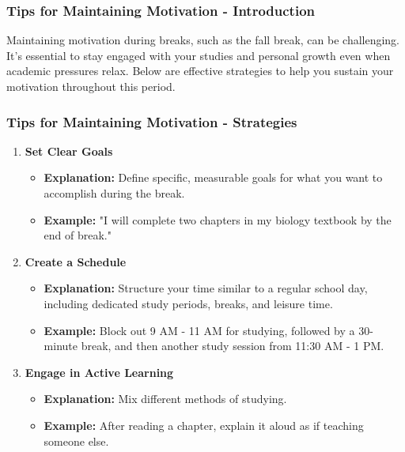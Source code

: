 \documentclass[aspectratio=169]{beamer}
\begin{document}
\begin{frame}[fragile]
    \frametitle{Tips for Maintaining Motivation - Introduction}
    Maintaining motivation during breaks, such as the fall break, can be challenging. 
    It's essential to stay engaged with your studies and personal growth even when academic pressures relax. 
    Below are effective strategies to help you sustain your motivation throughout this period.
\end{frame}

\begin{frame}[fragile]
    \frametitle{Tips for Maintaining Motivation - Strategies}
    \begin{enumerate}
        \item \textbf{Set Clear Goals}
        \begin{itemize}
            \item \textbf{Explanation:} Define specific, measurable goals for what you want to accomplish during the break.
            \item \textbf{Example:} "I will complete two chapters in my biology textbook by the end of break."
        \end{itemize}

        \item \textbf{Create a Schedule}
        \begin{itemize}
            \item \textbf{Explanation:} Structure your time similar to a regular school day, including dedicated study periods, breaks, and leisure time.
            \item \textbf{Example:} Block out 9 AM - 11 AM for studying, followed by a 30-minute break, and then another study session from 11:30 AM - 1 PM.
        \end{itemize}

        \item \textbf{Engage in Active Learning}
        \begin{itemize}
            \item \textbf{Explanation:} Mix different methods of studying.
            \item \textbf{Example:} After reading a chapter, explain it aloud as if teaching someone else.
        \end{itemize}
    \end{enumerate}
\end{frame}
\end{document}
